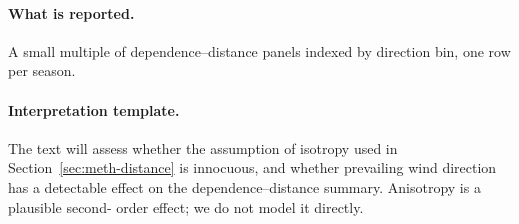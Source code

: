 \paragraph{What is reported.}
A small multiple of dependence--distance panels indexed by direction
bin, one row per season.

\paragraph{Interpretation template.}
The text will assess whether the assumption of isotropy used in
Section~\ref{sec:meth-distance} is innocuous, and whether
prevailing wind direction has a detectable effect on the
dependence--distance summary. Anisotropy is a plausible second-
order effect; we do not model it directly.
